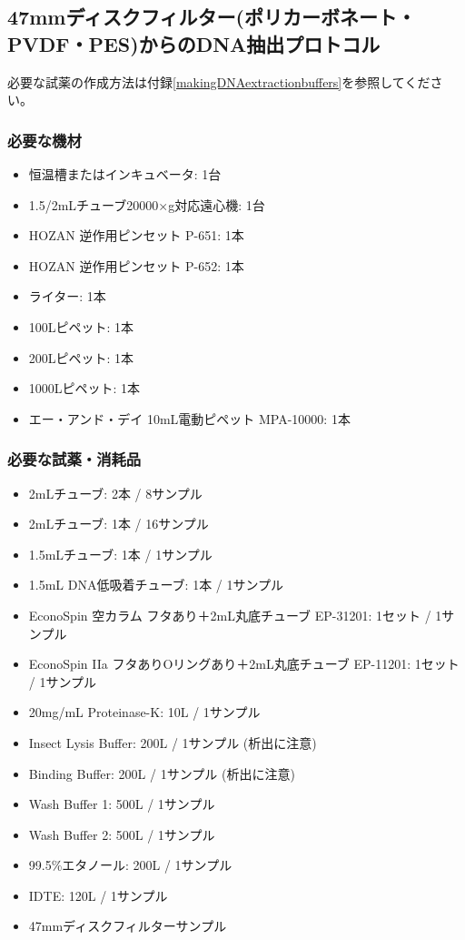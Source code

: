 \documentclass[titlepage,10pt,a4paper]{jsbook}
\begin{document}
\subsection{47mmディスクフィルター(ポリカーボネート・PVDF・PES)からのDNA抽出プロトコル}

必要な試薬の作成方法は付録\ref{makingDNAextractionbuffers}を参照してください。

\subsubsection{必要な機材}
\begin{itemize}
\item 恒温槽またはインキュベータ: 1台
\item 1.5/2mLチューブ20000×g対応遠心機: 1台
\item HOZAN 逆作用ピンセット P-651: 1本
\item HOZAN 逆作用ピンセット P-652: 1本
\item ライター: 1本
\item 100{\textmu}Lピペット: 1本
\item 200{\textmu}Lピペット: 1本
\item 1000{\textmu}Lピペット: 1本
\item エー・アンド・デイ 10mL電動ピペット MPA-10000: 1本
\end{itemize}

\subsubsection{必要な試薬・消耗品}
\begin{itemize}
\item 2mLチューブ: 2本 / 8サンプル
\item 2mLチューブ: 1本 / 16サンプル
\item 1.5mLチューブ: 1本 / 1サンプル
\item 1.5mL DNA低吸着チューブ: 1本 / 1サンプル
\item EconoSpin 空カラム フタあり＋2mL丸底チューブ EP-31201: 1セット / 1サンプル
\item EconoSpin IIa フタありOリングあり＋2mL丸底チューブ EP-11201: 1セット / 1サンプル
\item 20mg/mL Proteinase-K: 10{\textmu}L / 1サンプル
\item Insect Lysis Buffer: 200{\textmu}L / 1サンプル (析出に注意)
\item Binding Buffer: 200{\textmu}L / 1サンプル (析出に注意)
\item Wash Buffer 1: 500{\textmu}L / 1サンプル
\item Wash Buffer 2: 500{\textmu}L / 1サンプル
\item 99.5\%エタノール: 200{\textmu}L / 1サンプル
\item IDTE: 120{\textmu}L / 1サンプル
\item 47mmディスクフィルターサンプル
\end{itemize}
\end{document}

